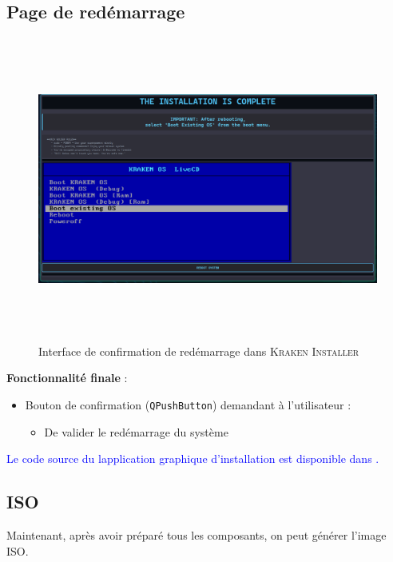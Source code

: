 \subsection{Page de redémarrage}


\begin{figure}[H]
  \centering
  \includegraphics[width=1\textwidth, height=10cm]{images_pfe/finish.png}
  \caption{Interface de confirmation de redémarrage dans \textsc{Kraken Installer}}
  \label{fig:reboot-page}
\end{figure}
\label{subsec:reboot}

\textbf{Fonctionnalité finale} :
\begin{itemize}
    \item Bouton de confirmation (\texttt{QPushButton}) demandant à l'utilisateur :
    \begin{itemize}
        \item De valider le redémarrage du système
        
    \end{itemize}
 
 \end{itemize}




\textcolor{blue}{Le code source du  lapplication  graphique d’installation est disponible dans  \cite{installateur_gui}.}
\subsection{ISO}

Maintenant, après avoir préparé tous les composants, on peut générer l'image ISO.\


